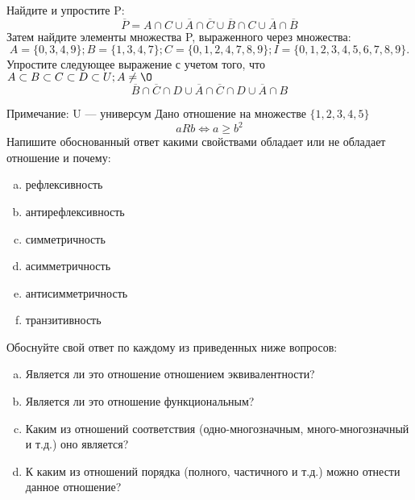\documentclass[10pt]{exam}
\begin{document}
\begin{questions}
\question
Найдите и упростите P:
\begin{equation*}
\overline{P} = A \cap C \cup \overline{A} \cap \overline{C} \cup \overline{B} \cap C \cup \overline{A} \cap \overline{B}
\end{equation*}
Затем найдите элементы множества P, выраженного через множества:
\begin{equation*}
A = \{0, 3, 4, 9\}; 
B = \{1, 3, 4, 7\};
C = \{0, 1, 2, 4, 7, 8, 9\};
I = \{0, 1, 2, 3, 4, 5, 6, 7, 8, 9\}.
\end{equation*}\question
Упростите следующее выражение с учетом того, что $A\subset B \subset C \subset D \subset U; A \neq \O$
\begin{equation*}
\overline{B} \cap \overline{C} \cap D \cup \overline{A} \cap \overline{C} \cap D \cup \overline{A} \cap B
\end{equation*}

Примечание: U — универсум\question
Дано отношение на множестве $\{1, 2, 3, 4, 5\}$ 
\begin{equation*}
aRb \iff a \geq b^2
\end{equation*}
Напишите обоснованный ответ какими свойствами обладает или не обладает отношение и почему:   
\begin{enumerate} [a)]\setcounter{enumi}{0}
\item рефлексивность
\item антирефлексивность
\item симметричность
\item асимметричность
\item антисимметричность
\item транзитивность
\end{enumerate}

Обоснуйте свой ответ по каждому из приведенных ниже вопросов:
\begin{enumerate} [a)]\setcounter{enumi}{0}
    \item Является ли это отношение отношением эквивалентности?
    \item Является ли это отношение функциональным?
    \item Каким из отношений соответствия (одно-многозначным, много-многозначный и т.д.) оно является?
    \item К каким из отношений порядка (полного, частичного и т.д.) можно отнести данное отношение?
\end{enumerate}



\end{questions}
\end{document}
